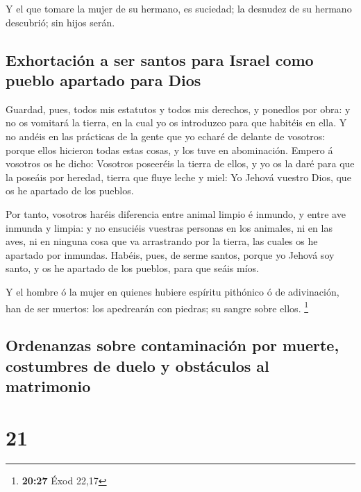 Y el que tomare la mujer de su hermano, es suciedad; la
desnudez de su hermano descubrió; sin hijos serán.

\hypertarget{exhortaciuxf3n-a-ser-santos-para-israel-como-pueblo-apartado-para-dios}{%
\subsection{Exhortación a ser santos para Israel como pueblo apartado
para
Dios}\label{exhortaciuxf3n-a-ser-santos-para-israel-como-pueblo-apartado-para-dios}}

 Guardad, pues, todos mis estatutos y todos mis derechos, y
ponedlos por obra: y no os vomitará la tierra, en la cual yo os
introduzco para que habitéis en ella.  Y no andéis en las
prácticas de la gente que yo echaré de delante de vosotros: porque ellos
hicieron todas estas cosas, y los tuve en abominación. 
Empero á vosotros os he dicho: Vosotros poseeréis la tierra de ellos, y
yo os la daré para que la poseáis por heredad, tierra que fluye leche y
miel: Yo Jehová vuestro Dios, que os he apartado de los pueblos.

 Por tanto, vosotros haréis diferencia entre animal limpio
é inmundo, y entre ave inmunda y limpia: y no ensuciéis vuestras
personas en los animales, ni en las aves, ni en ninguna cosa que va
arrastrando por la tierra, las cuales os he apartado por inmundas.
 Habéis, pues, de serme santos, porque yo Jehová soy santo,
y os he apartado de los pueblos, para que seáis míos.

 Y el hombre ó la mujer en quienes hubiere espíritu
pithónico ó de adivinación, han de ser muertos: los apedrearán con
piedras; su sangre sobre ellos. \footnote{\textbf{20:27} Éxod 22,17}

\hypertarget{ordenanzas-sobre-contaminaciuxf3n-por-muerte-costumbres-de-duelo-y-obstuxe1culos-al-matrimonio}{%
\subsection{Ordenanzas sobre contaminación por muerte, costumbres de
duelo y obstáculos al
matrimonio}\label{ordenanzas-sobre-contaminaciuxf3n-por-muerte-costumbres-de-duelo-y-obstuxe1culos-al-matrimonio}}

\hypertarget{section-20}{%
\section{21}\label{section-20}}

